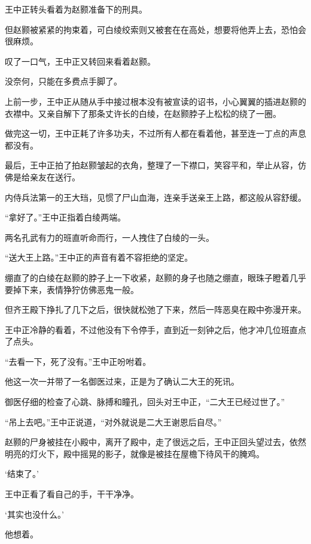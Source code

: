 王中正转头看着为赵颢准备下的刑具。

但赵颢被紧紧的拘束着，可白绫绞索则又被套在在高处，想要将他弄上去，恐怕会很麻烦。

叹了一口气，王中正又转回来看着赵颢。

没奈何，只能在多费点手脚了。

上前一步，王中正从随从手中接过根本没有被宣读的诏书，小心翼翼的插进赵颢的衣襟中。又亲自解下了那条丈许长的白绫，在赵颢脖子上松松的绕了一圈。

做完这一切，王中正耗了许多功夫，不过所有人都在看着他，甚至连一丁点的声息都没有。

最后，王中正拍了拍赵颢皱起的衣角，整理了一下襟口，笑容平和，举止从容，仿佛是给亲友在送行。

内侍兵法第一的王大珰，见惯了尸山血海，连亲手送亲王上路，都这般从容舒缓。

“拿好了。”王中正指着白绫两端。

两名孔武有力的班直听命而行，一人拽住了白绫的一头。

“送大王上路。”王中正的声音有着不容拒绝的坚定。

绷直了的白绫在赵颢的脖子上一下收紧，赵颢的身子也随之绷直，眼珠子瞪着几乎要掉下来，表情狰狞仿佛恶鬼一般。

但齐王殿下挣扎了几下之后，很快就松弛了下来，然后一阵恶臭在殿中弥漫开来。

王中正冷静的看着，不过他没有下令停手，直到近一刻钟之后，他才冲几位班直点了点头。

“去看一下，死了没有。”王中正吩咐着。

他这一次一并带了一名御医过来，正是为了确认二大王的死讯。

御医仔细的检查了心跳、脉搏和瞳孔，回头对王中正，“二大王已经过世了。”

“吊上去吧。”王中正说道，“对外就说是二大王谢恩后自尽。”

赵颢的尸身被挂在小殿中，离开了殿中，走了很远之后，王中正回头望过去，依然明亮的灯火下，殿中摇晃的影子，就像是被挂在屋檐下待风干的腌鸡。

‘结束了。’

王中正看了看自己的手，干干净净。

‘其实也没什么。’

他想着。

